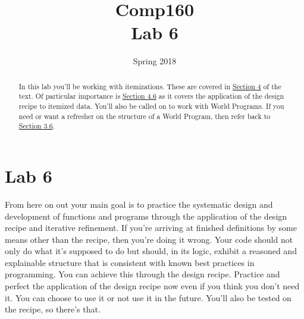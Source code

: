 \documentclass[nobib]{tufte-handout}
\title{Comp160 \\ Lab 6 }
\author{}
\date{ Spring 2018 }
\begin{document}
\maketitle

\begin{abstract}
In this lab you'll be working with itemizations. These are covered in \href{http://htdp.org/2018-01-06/Book/part_one.html#%28part._ch~3aintervals-enums%29}{Section 4} of the text. Of particular importance is \href{http://htdp.org/2018-01-06/Book/part_one.html#%28part._sec~3adesign-itemization%29}{Section 4.6} as it covers the application of the design recipe to itemized data. You'll also be called on to work with World Programs. If you need or want a refresher on the structure of a World Program, then refer back to \href{http://htdp.org/2018-01-06/Book/part_one.html#%28part._.D.K._sec~3adesign-world%29}{Section 3.6}.
\end{abstract}

\section*{Lab 6}
From here on out your main goal is to practice the systematic design and development of functions and programs through the application of the design recipe and iterative refinement. If you're arriving at finished definitions by some means other than the recipe, then you're doing it wrong. Your code should not only do what it's supposed to do but should, in its logic, exhibit a reasoned and explainable structure that is consistent with known best practices in programming.  You can achieve this through the design recipe.  Practice and perfect the application of the design recipe now even if you think you don't need it. You can choose to use it or not use it in the future. You'll also be tested on the recipe, so there's that.
\end{document}
